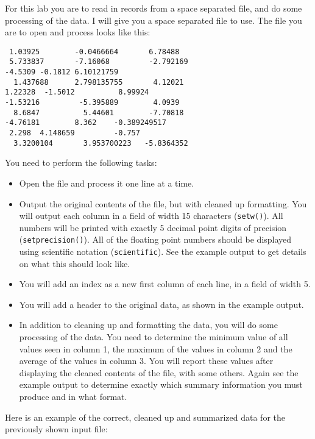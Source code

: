 \documentclass[11pt]{article}
\begin{document}
For this lab you are to read in records from a space separated file, and
do some processing of the data.  I will give you a space separated file
to use.  The file you are to open and process looks like this:


\begin{verbatim}
 1.03925        -0.0466664       6.78488        
 5.733837       -7.16068         -2.792169      
-4.5309 -0.1812 6.10121759      
  1.437688      2.798135755       4.12021       
1.22328  -1.5012          8.99924       
-1.53216         -5.395889        4.0939        
  8.6847          5.44601        -7.70818       
-4.76181        8.362    -0.389249517   
 2.298  4.148659         -0.757 
  3.3200104       3.953700223   -5.8364352
\end{verbatim}

You need to perform the following tasks:

\begin{itemize}
\item Open the file and process it one line at a time.
\item Output the original contents of the file, but with cleaned up
  formatting.  You will output each column in a field of width 15
  characters (\verb~setw()~).  All numbers will be printed with exactly 5
  decimal point digits of precision (\verb~setprecision()~).  All of the
  floating point numbers should be displayed using scientific notation
  (\verb~scientific~).  See the example output to get details on what
  this should look like.
\item You will add an index as a new first column of each line, in a field
  of width 5.
\item You will add a header to the original data, as shown in the example
  output.
\item In addition to cleaning up and formatting the data, you will do some
  processing of the data.  You need to determine the minimum value of
  all values seen in column 1, the maximum of the values in column 2
  and the average of the values in column 3.  You will report these
  values after displaying the cleaned contents of the file, with some
  others.  Again see the example output to determine exactly which
  summary information you must produce and in what format.
\end{itemize}

Here is an example of the correct, cleaned up and summarized data for
the previously shown input file:
\end{document}
